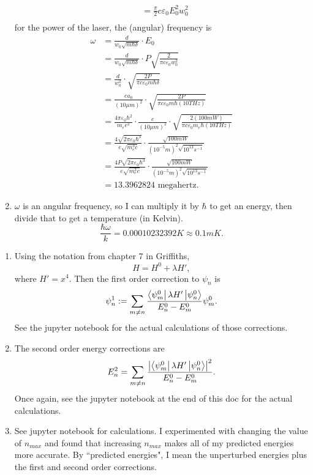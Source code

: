 \documentclass{article}
\begin{document}
\begin{enumerate}[label=(\alph*)]
\begin{align*}
              &= \frac{\pi}{2} c \varepsilon_0 E_0^2 w_0^2 \\
        \end{align*}
        for the power of the laser, the (angular) frequency is
        \begin{align*}
        \omega &= \frac{d}{w_0 \sqrt{m \hbar \delta}}\cdot E_0 \\
               &= \frac{d}{w_0 \sqrt{m \hbar \delta}}\cdot P \sqrt{ \frac{2}{\pi c \varepsilon_0 w_0^2}} \\
               &= \frac{d}{w_0^2}\cdot \sqrt{ \frac{2P}{\pi c \varepsilon_0 m \hbar \delta}} \\
               &= \frac{e a_0}{(10 \mu m)^2}\cdot \sqrt{ \frac{2P}{\pi c \varepsilon_0 m \hbar (10 THz)}} \\
               &= \frac{4 \pi \varepsilon_0 \hbar^2}{m_e e^2} \cdot \frac{e }{(10 \mu m)^2}\cdot \sqrt{ \frac{2(100mW)}{\pi c \varepsilon_0 m_e \hbar (10 THz)}} \\
               &= \frac{4 \sqrt{2 \pi \varepsilon_0 \hbar^3}}{e \sqrt{m_e^3 c}} \cdot \frac{\sqrt{100 mW}}{(10^{-5}m)^2 \sqrt{10^{13} s^{-1}}} \\
               &= \frac{4 P \sqrt{2 \pi \varepsilon_0 \hbar^3}}{e \sqrt{m_e^3 c}} \cdot \frac{\sqrt{100mW}}{(10^{-5}m)^2 \sqrt{10^{13} s^{-1}}} \\
               &= 13.3962824 \text{ megahertz}.
        \end{align*}
    \item $\omega$ is an angular frequency, so I can multiply it by $\hbar$ to get an energy, then divide that to get a temperature (in Kelvin).
        \[ \frac{\hbar \omega}{k} = 0.00010232392 K \approx 0.1 mK. \]
        
\end{enumerate}

\bigskip
\begin{prob}
\end{prob}
\begin{enumerate}[label=(\alph*)]
    \item Using the notation from chapter 7 in Griffiths,
        \[ H = H^0 + \lambda H', \]
        where $H'=x^4$. Then the first order correction to $\psi_n$ is
        \[ \psi_n^1 := \sum_{m \neq n} \frac{\left\langle \psi_m^0 \right\rvert\lambda H'\left\lvert \psi_n^0 \right\rangle}{E_n^0-E_m^0} \psi_m^0. \]
        See the jupyter notebook for the actual calculations of those corrections.
    \item The second order energy corrections are
        \[ E_n^2 = \sum_{m \neq n} \frac{\left\lvert \left\langle \psi_m^0 \right\rvert \lambda H' \left\lvert \psi_n^0 \right\rangle \right\rvert^2}{E_n^0-E_m^0}. \]
        Once again, see the jupyter notebook at the end of this doc for the actual calculations.
    \item See jupyter notebook for calculations. I experimented with changing the value of $n_{max}$ and found that increasing $n_{max}$ makes all of my predicted energies more accurate. By ``predicted energies", I mean the unperturbed energies plus the first and second order corrections.
\end{enumerate}
\end{document}
